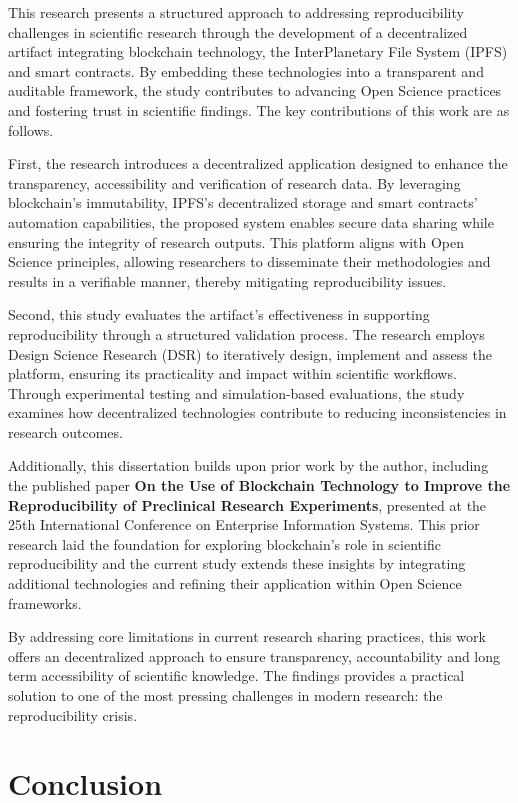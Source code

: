 \documentclass{article}
\begin{document}
This research presents a structured approach to addressing reproducibility challenges in scientific research through the development of a decentralized artifact integrating blockchain technology, the InterPlanetary File System (IPFS) and smart contracts. By embedding these technologies into a transparent and auditable framework, the study contributes to advancing Open Science practices and fostering trust in scientific findings. The key contributions of this work are as follows.

First, the research introduces a decentralized application designed to enhance the transparency, accessibility and verification of research data. By leveraging blockchain's immutability, IPFS’s decentralized storage and smart contracts’ automation capabilities, the proposed system enables secure data sharing while ensuring the integrity of research outputs. This platform aligns with Open Science principles, allowing researchers to disseminate their methodologies and results in a verifiable manner, thereby mitigating reproducibility issues.

Second, this study evaluates the artifact’s effectiveness in supporting reproducibility through a structured validation process. The research employs Design Science Research (DSR) to iteratively design, implement and assess the platform, ensuring its practicality and impact within scientific workflows. Through experimental testing and simulation-based evaluations, the study examines how decentralized technologies contribute to reducing inconsistencies in research outcomes.

Additionally, this dissertation builds upon prior work by the author, including the published paper \textbf{On the Use of Blockchain Technology to Improve the Reproducibility of Preclinical Research Experiments}, presented at the 25th International Conference on Enterprise Information Systems. This prior research laid the foundation for exploring blockchain’s role in scientific reproducibility and the current study extends these insights by integrating additional technologies and refining their application within Open Science frameworks.

By addressing core limitations in current research sharing practices, this work offers an decentralized approach to ensure transparency, accountability and long term accessibility of scientific knowledge. The findings provides a practical solution to one of the most pressing challenges in modern research: the reproducibility crisis.

\section{Conclusion}
\end{document}
